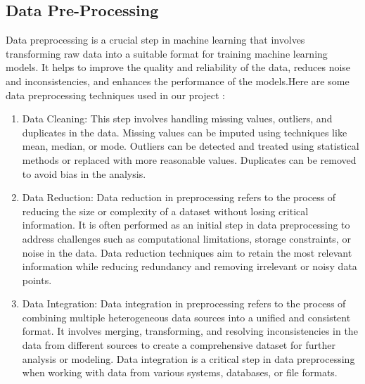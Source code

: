 \subsection{Data Pre-Processing}
\par
Data preprocessing is a crucial step in machine learning that involves transforming raw data into a suitable format for training machine learning models. It helps to improve the quality and reliability of the data, reduces noise and inconsistencies, and enhances the performance of the models.Here are some data preprocessing techniques used in our project :
\begin{enumerate}
  \item Data Cleaning: This step involves handling missing values, outliers, and duplicates in the data. Missing values can be imputed using techniques like mean, median, or mode. Outliers can be detected and treated using statistical methods or replaced with more reasonable values. Duplicates can be removed to avoid bias in the analysis.
  \item Data Reduction: Data reduction in preprocessing refers to the process of reducing the size or complexity of a dataset without losing critical information. It is often performed as an initial step in data preprocessing to address challenges such as computational limitations, storage constraints, or noise in the data. Data reduction techniques aim to retain the most relevant information while reducing redundancy and removing irrelevant or noisy data points. 
  \item Data Integration: Data integration in preprocessing refers to the process of combining multiple heterogeneous data sources into a unified and consistent format. It involves merging, transforming, and resolving inconsistencies in the data from different sources to create a comprehensive dataset for further analysis or modeling. Data integration is a critical step in data preprocessing when working with data from various systems, databases, or file formats. 
  
\end{enumerate}
